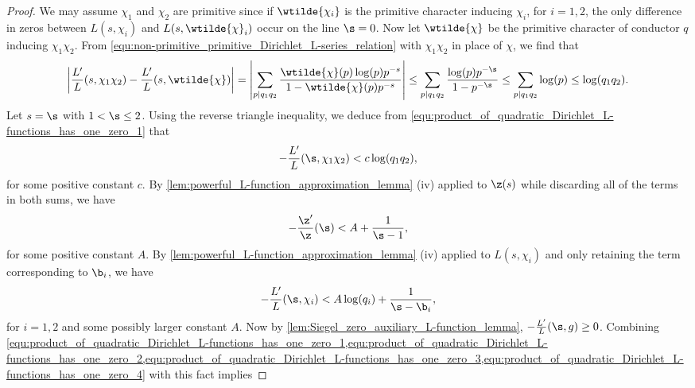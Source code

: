     \begin{proof}
        We may assume $\chi_{1}$ and $\chi_{2}$ are primitive since if $\wtilde{\chi_{i}}$ is the primitive character inducing $\chi_{i}$, for $i = 1,2$, the only difference in zeros between $L(s,\chi_{i})$ and $L(s,\wtilde{\chi}_{i})$ occur on the line $\s = 0$. Now let $\wtilde{\chi}$ be the primitive character of conductor $q$ inducing $\chi_{1}\chi_{2}$. From \cref{equ:non-primitive_primitive_Dirichlet_L-series_relation} with $\chi_{1}\chi_{2}$ in place of $\chi$, we find that
        \begin{equation}\label{equ:product_of_quadratic_Dirichlet_L-functions_has_one_zero_1}
          \left|\frac{L'}{L}(s,\chi_{1}\chi_{2})-\frac{L'}{L}(s,\wtilde{\chi})\right| = \left|\sum_{p \mid q_{1}q_{2}}\frac{\wtilde{\chi}(p)\log(p)p^{-s}}{1-\wtilde{\chi}(p)p^{-s}}\right| \le \sum_{p \mid q_{1}q_{2}}\frac{\log(p)p^{-\s}}{1-p^{-\s}} \le \sum_{p \mid q_{1}q_{2}}\log(p) \le \log(q_{1}q_{2}).
        \end{equation}
        Let $s = \s$ with $1 < \s \le 2$. Using the reverse triangle inequality, we deduce from \cref{equ:product_of_quadratic_Dirichlet_L-functions_has_one_zero_1} that
        \begin{equation}\label{equ:product_of_quadratic_Dirichlet_L-functions_has_one_zero_2}
          -\frac{L'}{L}(\s,\chi_{1}\chi_{2}) < c\log(q_{1}q_{2}),
        \end{equation}
        for some positive constant $c$.
        By \cref{lem:powerful_L-function_approximation_lemma} (iv) applied to $\z(s)$ while discarding all of the terms in both sums, we have
        \begin{equation}\label{equ:product_of_quadratic_Dirichlet_L-functions_has_one_zero_3}
          -\frac{\z'}{\z}(\s) < A+\frac{1}{\s-1},
        \end{equation}
        for some positive constant $A$. By \cref{lem:powerful_L-function_approximation_lemma} (iv) applied to $L(s,\chi_{i})$ and only retaining the term corresponding to $\b_{i}$, we have
        \begin{equation}\label{equ:product_of_quadratic_Dirichlet_L-functions_has_one_zero_4}
          -\frac{L'}{L}(\s,\chi_{i}) < A\log(q_{i})+\frac{1}{\s-\b_{i}},
        \end{equation}
        for $i = 1,2$ and some possibly larger constant $A$. Now by \cref{lem:Siegel_zero_auxiliary_L-function_lemma}, $-\frac{L'}{L}(\s,g) \ge 0$. Combining \cref{equ:product_of_quadratic_Dirichlet_L-functions_has_one_zero_1,equ:product_of_quadratic_Dirichlet_L-functions_has_one_zero_2,equ:product_of_quadratic_Dirichlet_L-functions_has_one_zero_3,equ:product_of_quadratic_Dirichlet_L-functions_has_one_zero_4} with this fact implies

\end{proof}
